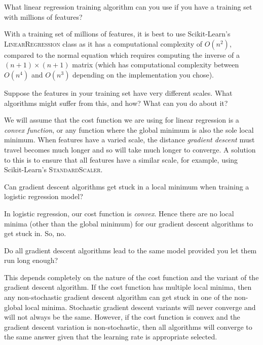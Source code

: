 
\question What linear regression training algorithm can you use if you have a training
set with millions of features?
\begin{solution}
    With a training set of millions of features, it is best to use Scikit-Learn's
    \textsc{LinearRegression} class as it has a computational complexity of $O(n^2)$,
    compared to the normal equation which requires computing the inverse of a
    $(n + 1) \times (n + 1)$ matrix
    (which has computational complexity between $O(n^4)$ and $O(n^3)$ depending
    on the implementation you chose).
\end{solution}

\question Suppose the features in your training set have very different scales.
What algorithms might suffer from this, and how?
What can you do about it?
\begin{solution}
    We will assume that the cost function we are using for linear regression is a
    \emph{convex function}, or any function where the global minimum is also the
    sole local minimum.
    When features have a varied scale, the distance \emph{gradient descent} must
    travel becomes much longer and so will take much longer to converge.
    A solution to this is to ensure that all features have a similar scale,
    for example, using Scikit-Learn's \textsc{StandardScaler}.
\end{solution}

\question Can gradient descent algorithms get stuck in a local minimum when training a
logistic regression model?
\begin{solution}
    In logistic regression, our cost function is \emph{convex}.
    Hence there are no local minima (other than the global minimum)
    for our gradient descent algorithms to get stuck in. So, no.
\end{solution}

\question Do all gradient descent algorithms lead to the same model provided you let
them run long enough?
\begin{solution}
    This depends completely on the nature of the cost function and the variant of the
    gradient descent algorithm.
    If the cost function has multiple local minima, then any non-stochastic gradient descent
    algorithm can get stuck in one of the non-global local minima.
    Stochastic gradient descent variants will never converge and will
    not always be the same.
    However, if the cost function is convex and the gradient descent variation is
    non-stochastic, then all algorithms will converge to the same answer given that
    the learning rate is appropriate selected.
\end{solution}

